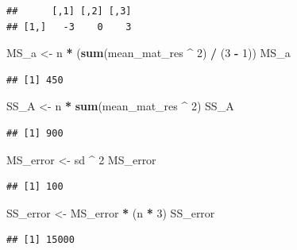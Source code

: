 \documentclass[
]{book}
\newenvironment{Shaded}{\begin{snugshade}}{\end{snugshade}}
\newcommand{\DecValTok}[1]{\textcolor[rgb]{0.00,0.00,0.81}{#1}}
\newcommand{\KeywordTok}[1]{\textcolor[rgb]{0.13,0.29,0.53}{\textbf{#1}}}
\newcommand{\NormalTok}[1]{#1}
\newcommand{\OperatorTok}[1]{\textcolor[rgb]{0.81,0.36,0.00}{\textbf{#1}}}
\newcommand{\StringTok}[1]{\textcolor[rgb]{0.31,0.60,0.02}{#1}}
\begin{document}
\begin{verbatim}
##      [,1] [,2] [,3]
## [1,]   -3    0    3
\end{verbatim}

\begin{Shaded}
\begin{Highlighting}[]
\NormalTok{MS_a <-}\StringTok{ }\NormalTok{n }\OperatorTok{*}\StringTok{ }\NormalTok{(}\KeywordTok{sum}\NormalTok{(mean_mat_res }\OperatorTok{^}\StringTok{ }\DecValTok{2}\NormalTok{) }\OperatorTok{/}\StringTok{ }\NormalTok{(}\DecValTok{3} \OperatorTok{-}\StringTok{ }\DecValTok{1}\NormalTok{))}
\NormalTok{MS_a}
\end{Highlighting}
\end{Shaded}

\begin{verbatim}
## [1] 450
\end{verbatim}

\begin{Shaded}
\begin{Highlighting}[]
\NormalTok{SS_A <-}\StringTok{ }\NormalTok{n }\OperatorTok{*}\StringTok{ }\KeywordTok{sum}\NormalTok{(mean_mat_res }\OperatorTok{^}\StringTok{ }\DecValTok{2}\NormalTok{)}
\NormalTok{SS_A}
\end{Highlighting}
\end{Shaded}

\begin{verbatim}
## [1] 900
\end{verbatim}

\begin{Shaded}
\begin{Highlighting}[]
\NormalTok{MS_error <-}\StringTok{ }\NormalTok{sd }\OperatorTok{^}\StringTok{ }\DecValTok{2}
\NormalTok{MS_error}
\end{Highlighting}
\end{Shaded}

\begin{verbatim}
## [1] 100
\end{verbatim}

\begin{Shaded}
\begin{Highlighting}[]
\NormalTok{SS_error <-}\StringTok{ }\NormalTok{MS_error }\OperatorTok{*}\StringTok{ }\NormalTok{(n }\OperatorTok{*}\StringTok{ }\DecValTok{3}\NormalTok{)}
\NormalTok{SS_error}
\end{Highlighting}
\end{Shaded}

\begin{verbatim}
## [1] 15000
\end{verbatim}
\end{document}

